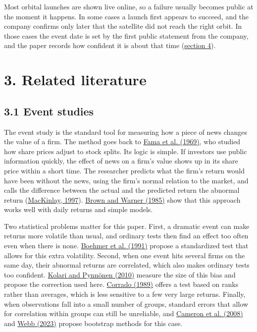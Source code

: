 \documentclass[12pt,a4paper]{article}
\begin{document}
Most orbital launches are shown live online, so a failure usually becomes public at the moment it happens. In some cases a launch first appears to succeed, and the company confirms only later that the satellite did not reach the right orbit. In those cases the event date is set by the first public statement from the company, and the paper records how confident it is about that time (\hyperlink{s4}{section 4}).

\section*{\hypertarget{s3}{}3. Related literature}
\subsection*{3.1 Event studies}
The event study is the standard tool for measuring how a piece of news changes the value of a firm. The method goes back to \hyperlink{ref-fama1969}{Fama et al. (1969)}, who studied how share prices adjust to stock splits. Its logic is simple. If investors use public information quickly, the effect of news on a firm's value shows up in its share price within a short time. The researcher predicts what the firm's return would have been without the news, using the firm's normal relation to the market, and calls the difference between the actual and the predicted return the abnormal return (\hyperlink{ref-mackinlay1997}{MacKinlay, 1997}). \hyperlink{ref-brown1985}{Brown and Warner (1985)} show that this approach works well with daily returns and simple models.

Two statistical problems matter for this paper. First, a dramatic event can make returns more volatile than usual, and ordinary tests then find an effect too often even when there is none. \hyperlink{ref-boehmer1991}{Boehmer et al. (1991)} propose a standardized test that allows for this extra volatility. Second, when one event hits several firms on the same day, their abnormal returns are correlated, which also makes ordinary tests too confident. \hyperlink{ref-kolari2010}{Kolari and Pynnönen (2010)} measure the size of this bias and propose the correction used here. \hyperlink{ref-corrado1989}{Corrado (1989)} offers a test based on ranks rather than averages, which is less sensitive to a few very large returns. Finally, when observations fall into a small number of groups, standard errors that allow for correlation within groups can still be unreliable, and \hyperlink{ref-cameron2008}{Cameron et al. (2008)} and \hyperlink{ref-webb2023}{Webb (2023)} propose bootstrap methods for this case.
\end{document}
